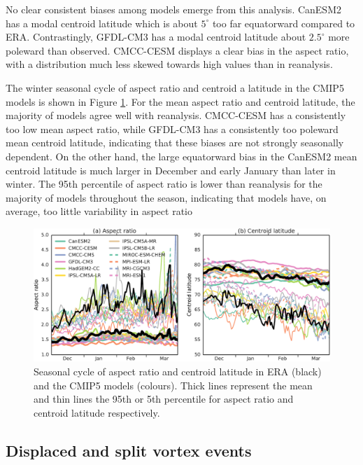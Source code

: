 No clear consistent biases among models emerge from this analysis. CanESM2 has a
modal centroid latitude which is about $5^{\circ}$ too far equatorward compared
to ERA. Contrastingly, GFDL-CM3 has a modal centroid latitude about
$2.5^{\circ}$ more poleward than observed. CMCC-CESM displays a clear bias in
the aspect ratio, with a distribution much less skewed towards high values than
in reanalysis.

The winter seasonal cycle of aspect ratio and centroid a latitude in the CMIP5
models is shown in Figure \ref{fig:cmip5_moments_stats_seas}. For the mean
aspect ratio and centroid latitude, the majority of models agree well with
reanalysis. CMCC-CESM has a consistently too low mean aspect ratio, while
GFDL-CM3 has a consistently too poleward mean centroid latitude, indicating that
these biases are not strongly seasonally dependent. On the other hand, the large
equatorward bias in the CanESM2 mean centroid latitude is much larger in
December and early January than later in winter. The 95th percentile of aspect
ratio is lower than reanalysis for the majority of models throughout the season,
indicating that models have, on average, too little variability in aspect ratio
 
\begin{figure}
 \centering
 \noindent\includegraphics[width=\textwidth]{figures/chapter-models/moments_seasonal_stats.pdf}
 \caption[Seasonal cycle of moment diagnostics in the CMIP5 models]{Seasonal
   cycle of aspect ratio and centroid latitude in ERA (black) and the CMIP5
   models (colours). Thick lines represent the mean and thin lines the 95th or
   5th percentile for aspect ratio and centroid latitude respectively.}
 \label{fig:cmip5_moments_stats_seas}
\end{figure}


\subsection{Displaced and split vortex events}

